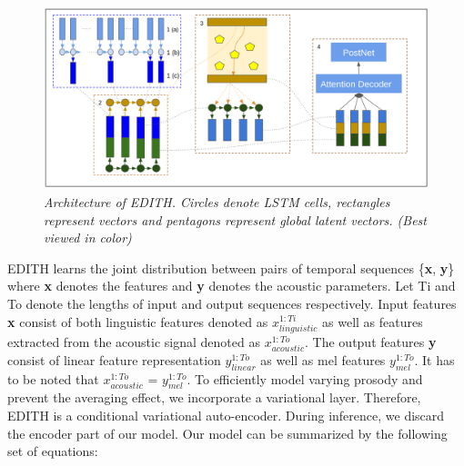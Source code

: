 \begin{figure}[t]
\centering
\includegraphics[scale=0.2]{images/EDITH_arch.png}
\caption{\textit{Architecture of EDITH. Circles denote LSTM cells, rectangles represent vectors and pentagons represent global latent vectors. (Best viewed in color)}} 
\label{edith_architecture}
\end{figure}  

EDITH learns the joint distribution between pairs of temporal sequences \{\textbf{x}, \textbf{y}\} where \textbf{x} denotes the features and \textbf{y} denotes the acoustic parameters. Let Ti and To denote the lengths of input and output sequences respectively. Input features \textbf{x} consist of both linguistic features denoted as \textbf{$x_{linguistic}^{1:Ti}$} as well as features extracted from the acoustic signal denoted as \textbf{$x_{acoustic}^{1:To}$}. The output features \textbf{y} consist of linear feature representation \textbf{$y_{linear}^{1:To}$} as well as mel features \textbf{$y_{mel}^{1:To}$}. It has to be noted that \textbf{$x_{acoustic}^{1:To}$} = \textbf{$y_{mel}^{1:To}$}. To efficiently model varying prosody and prevent the averaging effect, we incorporate a variational layer. Therefore, EDITH is a conditional variational auto-encoder. During inference, we discard the encoder part of our model. Our model can be summarized by the following set of equations: 



